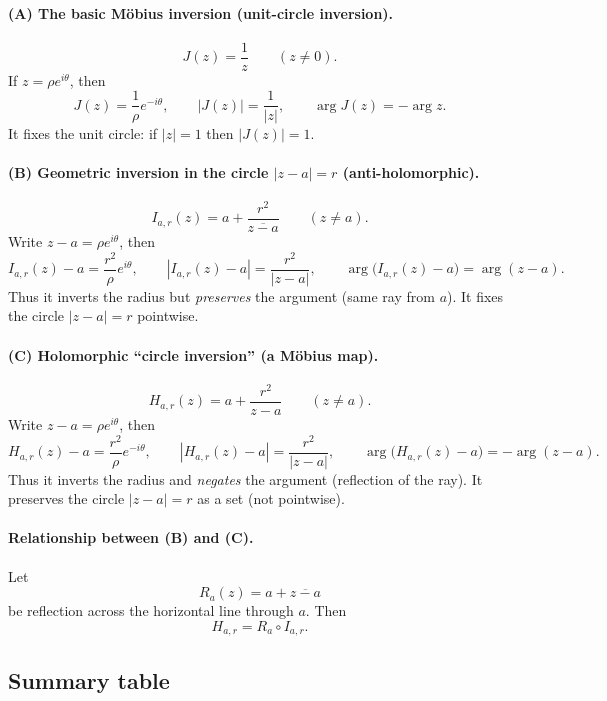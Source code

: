 \begin{problem}[CP-IV-0069]
\paragraph{\textbf{(A) The basic Möbius inversion (unit-circle inversion).}}
\[
J(z)=\frac{1}{z}\qquad (z\neq 0).
\]
If $z=\rho e^{i\theta}$, then
\[
J(z)=\frac{1}{\rho}e^{-i\theta},
\qquad
|J(z)|=\frac{1}{|z|},\qquad \arg J(z)=-\arg z.
\]
It fixes the unit circle: if $|z|=1$ then $|J(z)|=1$.

\paragraph{\textbf{(B) Geometric inversion in the circle $|z-a|=r$ (anti-holomorphic).}}
\[
I_{a,r}(z)=a+\frac{r^{2}}{\overline{z-a}}\qquad (z\neq a).
\]
Write $z-a=\rho e^{i\theta}$, then
\[
I_{a,r}(z)-a=\frac{r^{2}}{\rho}e^{i\theta},
\qquad
|I_{a,r}(z)-a|=\frac{r^{2}}{|z-a|},\qquad
\arg\bigl(I_{a,r}(z)-a\bigr)=\arg(z-a).
\]
Thus it inverts the radius but \emph{preserves} the argument (same ray from $a$). It fixes the circle $|z-a|=r$ pointwise.

\paragraph{\textbf{(C) Holomorphic “circle inversion” (a Möbius map).}}
\[
H_{a,r}(z)=a+\frac{r^{2}}{z-a}\qquad (z\neq a).
\]
Write $z-a=\rho e^{i\theta}$, then
\[
H_{a,r}(z)-a=\frac{r^{2}}{\rho}e^{-i\theta},
\qquad
|H_{a,r}(z)-a|=\frac{r^{2}}{|z-a|},\qquad
\arg\bigl(H_{a,r}(z)-a\bigr)=-\arg(z-a).
\]
Thus it inverts the radius and \emph{negates} the argument (reflection of the ray). It preserves the circle $|z-a|=r$ as a set (not pointwise).

\paragraph{\textbf{Relationship between (B) and (C).}}
Let
\[
R_a(z)=a+\overline{z-a}
\]
be reflection across the horizontal line through $a$. Then
\[
H_{a,r}=R_a\circ I_{a,r}.
\]

\subsection*{\textbf{Summary table}}


\end{problem}
